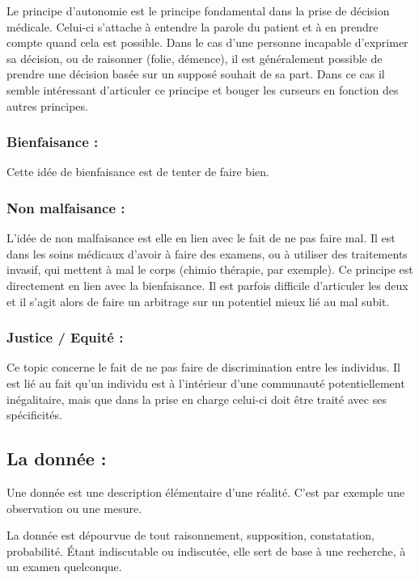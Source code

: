\documentclass[a4paper,12pt]{article}
\begin{document}
Le principe d'autonomie est le principe fondamental dans la prise de décision médicale. Celui-ci s'attache à entendre la parole du patient et à en prendre compte quand cela est possible. Dans le cas d'une personne incapable d'exprimer sa décision, ou de raisonner (folie, démence), il est généralement possible de prendre une décision basée sur un supposé souhait de sa part. Dans ce cas il semble intéressant d'articuler ce principe et bouger les curseurs en fonction des autres principes. 


\subsubsection{Bienfaisance : }

Cette idée de bienfaisance est de tenter de faire bien. 


\subsubsection{Non malfaisance : }

L'idée de non malfaisance est elle en lien avec le fait de ne pas faire mal. Il est dans les soins médicaux d'avoir à faire des examens, ou à utiliser des traitements invasif, qui mettent à mal le corps (chimio thérapie, par exemple). Ce principe est directement en lien avec la bienfaisance. Il est parfois difficile d'articuler les deux et il s'agit alors de faire un arbitrage sur un potentiel mieux lié au mal subit. 


\subsubsection{Justice / Equité : }

Ce topic concerne le fait de ne pas faire de discrimination entre les individus. Il est lié au fait qu'un individu est à l'intérieur d'une communauté potentiellement inégalitaire, mais que dans la prise en charge celui-ci doit être traité avec ses spécificités. 

\subsection{La donnée : }
Une donnée est une description élémentaire d’une réalité. C’est par exemple une observation ou une mesure.

La donnée est dépourvue de tout raisonnement, supposition, constatation, probabilité. Étant indiscutable ou indiscutée, elle sert de base à une recherche, à un examen quelconque.
\end{document}
